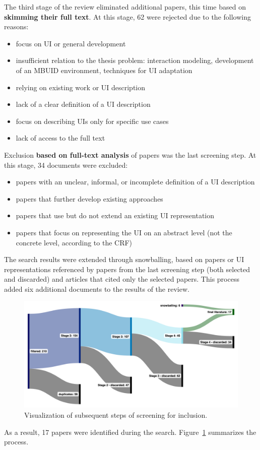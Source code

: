 The third stage of the review eliminated additional papers, this time based on \textbf{skimming their full text}.
At this stage, 62 were rejected due to the following reasons:
\begin{itemize}
    \item focus on UI or general development
    \item insufficient relation to the thesis problem: interaction modeling, development of an MBUID environment, techniques for UI adaptation
    \item relying on existing work or UI description
    \item lack of a clear definition of a UI description
    \item focus on describing UIs only for specific use cases
    \item lack of access to the full text
\end{itemize}

Exclusion \textbf{based on full-text analysis} of papers was the last screening step.
At this stage, 34 documents were excluded:
\begin{itemize}
    \item papers with an unclear, informal, or incomplete definition of a UI description
    \item papers that further develop existing approaches
    \item papers that use but do not extend an existing UI representation
    \item papers that focus on representing the UI on an abstract level (not the concrete level, according to the CRF)
\end{itemize}

The search results were extended through snowballing, based on papers or UI representations referenced by papers from the last screening step (both selected and discarded) and articles that cited only the selected papers.
This process added six additional documents to the results of the review.

\begin{figure}
    \centering
    \includegraphics[width=\textwidth]{./2-literature-review/conducting-the-search}
    \caption{Visualization of subsequent steps of screening for inclusion.}
    \label{fig:conducting-the-search-vis}
\end{figure}

As a result, 17 papers were identified during the search.
Figure~\ref{fig:conducting-the-search-vis} summarizes the process.


